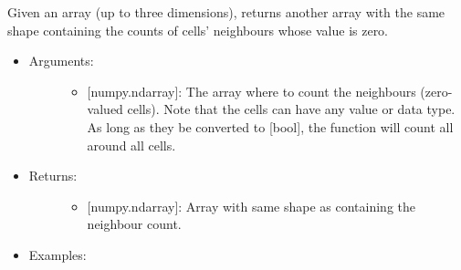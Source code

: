 \documentclass[letterpaper,10pt,english]{sphinxmanual}
\begin{document}
\begin{fulllineitems}
\label{\detokenize{spatial:data_tools.spatial.neighbour_count}}
Given an array (up to three dimensions), returns another array with
the same shape containing the counts of cells’ neighbours whose
value is zero.
\begin{itemize}
\item {} \begin{description}
\item[{Arguments:}] \leavevmode\begin{itemize}
\item {} 
 {[}numpy.ndarray{]}: The array where to count the neighbours
(zero-valued cells). Note that the cells can have any value
or data type. As long as they be converted to {[}bool{]}, the
function will count all  around all  cells.

\end{itemize}

\end{description}

\item {} \begin{description}
\item[{Returns:}] \leavevmode\begin{itemize}
\item {} 
{[}numpy.ndarray{]}: Array with same shape as  containing the
neighbour count.

\end{itemize}

\end{description}

\item {} \begin{description}
\item[{Examples:}] \leavevmode
\begin{sphinxVerbatim}[commandchars=\\\{\}]
    
\PYG{g+go}{array([[0, 0, 1, 1, 0],}
\PYG{g+go}{       [1, 0, 0, 1, 1]])}
\PYG{g+go}{array([[0, 0, 2, 1, 0],}
\PYG{g+go}{       [2, 0, 0, 2, 1]])}
\end{sphinxVerbatim}


\end{description}
\end{itemize}
\end{fulllineitems}
\end{document}
